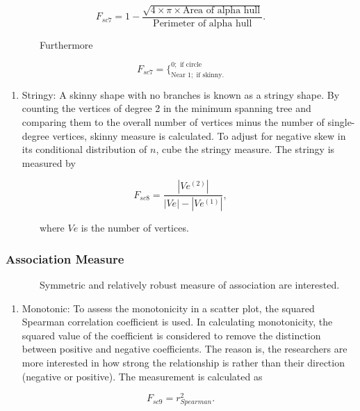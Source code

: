 \documentclass{article}
\begin{document}
\begin{equation}
    F_{sc7} = 1- \frac{\sqrt{4 \times \pi \times \text{Area of alpha hull}}}{\text{Perimeter of alpha hull}}.
\end{equation}

~~~~~~~Furthermore

\[F_{sc7} = \Bigg\{^{0; \text{ if circle}}_{\text{Near } 1 ; \text{ if skinny}.}\]

\begin{enumerate}
\def\labelenumi{\roman{enumi})}
\setcounter{enumi}{2}
\tightlist
\item
  Stringy: A skinny shape with no branches is known as a stringy shape.
  By counting the vertices of degree 2 in the minimum spanning tree and
  comparing them to the overall number of vertices minus the number of
  single-degree vertices, skinny measure is calculated. To adjust for
  negative skew in its conditional distribution of \(n\), cube the
  stringy measure. The stringy is measured by
\end{enumerate}

\begin{equation}
    F_{sc8} = \frac{|Ve^{(2)}|}{|Ve| - |Ve^{(1)}|},
\end{equation}

~~~~~~~where \(Ve\) is the number of vertices.

\hypertarget{association-measure}{%
\subsubsection{Association Measure}\label{association-measure}}

~~~~~~~Symmetric and relatively robust measure of association are
interested.

\begin{enumerate}
\def\labelenumi{\roman{enumi})}
\tightlist
\item
  Monotonic: To assess the monotonicity in a scatter plot, the squared
  Spearman correlation coefficient is used. In calculating monotonicity,
  the squared value of the coefficient is considered to remove the
  distinction between positive and negative coefficients. The reason is,
  the researchers are more interested in how strong the relationship is
  rather than their direction (negative or positive). The measurement is
  calculated as
\end{enumerate}

\begin{equation}
    F_{sc9} = r^2_{Spearman}.
\end{equation}
\end{document}
